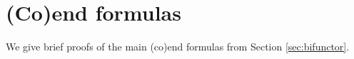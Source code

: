 


\section{(Co)end formulas}\label{sec:coend-proofs}
We give brief proofs of the main (co)end formulas from Section \ref{sec:bifunctor}.

